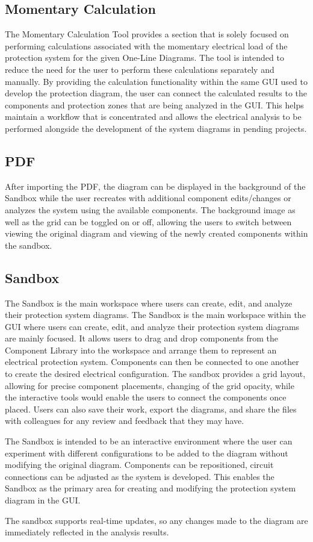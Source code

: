 \subsection{Momentary Calculation}
The Momentary Calculation Tool provides a section that is solely focused 
on performing calculations associated with the momentary electrical load 
of the protection system for the given One-Line Diagrams. The tool is 
intended to reduce the need for the user to perform these calculations 
separately and manually. By providing the calculation functionality within 
the same GUI used to develop the protection diagram, the user can connect 
the calculated results to the components and protection zones that are being 
analyzed in the GUI. This helps maintain a workflow that is concentrated and 
allows the electrical analysis to be performed alongside the development of 
the system diagrams in pending projects.

\subsection{PDF}
After importing the PDF, the diagram can be displayed in the background 
of the Sandbox while the user recreates with additional component 
edits/changes or analyzes the system using the available components.
The background image as well as the grid can be toggled on or off, 
allowing the users to switch between viewing the original diagram 
and viewing of the newly created components within the sandbox. 

\subsection{Sandbox}
The Sandbox is the main workspace where users can create, edit, and analyze
their protection system diagrams. The Sandbox is the main workspace within the 
GUI where users can create, edit, and analyze their protection system diagrams 
are mainly focused. It allows users to drag and drop components from the Component 
Library into the workspace and arrange them to represent an electrical protection 
system. Components can then be connected to one another to create the desired electrical 
configuration. The sandbox provides a grid layout, allowing for precise component placements, 
changing of the grid opacity, while the interactive tools would enable the users to connect 
the components once placed. Users can also save their work, export the diagrams, and share 
the files with colleagues for any review and feedback that they may have. 

The Sandbox is intended to be an interactive environment where the user can experiment with 
different configurations to be added to the diagram without modifying the original 
diagram. Components can be repositioned, circuit connections can be adjusted as the 
system is developed. This enables the Sandbox as the primary area for creating and 
modifying the protection system diagram in the GUI.

The sandbox supports real-time updates, so any changes made to the diagram are 
immediately reflected in the analysis results. 
